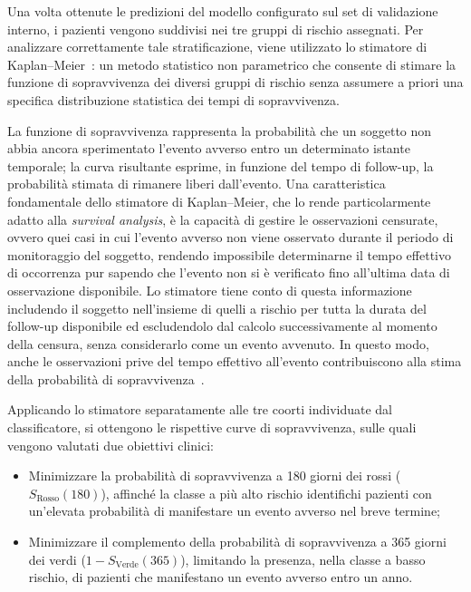 \documentclass[a4paper,12pt]{report}
\begin{document}
Una volta ottenute le predizioni del modello configurato sul set di validazione interno, i pazienti vengono suddivisi nei tre gruppi di rischio assegnati. Per analizzare correttamente tale stratificazione, viene utilizzato lo stimatore di Kaplan--Meier~\cite{Kaplan01061958}: un metodo statistico non parametrico che consente di stimare la funzione di sopravvivenza dei diversi gruppi di rischio senza assumere a priori una specifica distribuzione statistica dei tempi di sopravvivenza.

La funzione di sopravvivenza rappresenta la probabilità che un soggetto non abbia ancora sperimentato l'evento avverso entro un determinato istante temporale; la curva risultante esprime, in funzione del tempo di follow-up, la probabilità stimata di rimanere liberi dall'evento. Una caratteristica fondamentale dello stimatore di Kaplan--Meier, che lo rende particolarmente adatto alla \textit{survival analysis}, è la capacità di gestire le osservazioni censurate, ovvero quei casi in cui l'evento avverso non viene osservato durante il periodo di monitoraggio del soggetto, rendendo impossibile determinarne il tempo effettivo di occorrenza pur sapendo che l'evento non si è verificato fino all'ultima data di osservazione disponibile. Lo stimatore tiene conto di questa informazione includendo il soggetto nell'insieme di quelli a rischio per tutta la durata del follow-up disponibile ed escludendolo dal calcolo successivamente al momento della censura, senza considerarlo come un evento avvenuto. In questo modo, anche le osservazioni prive del tempo effettivo all'evento contribuiscono alla stima della probabilità di sopravvivenza~\cite{Kaplan01061958}.

Applicando lo stimatore separatamente alle tre coorti individuate dal classificatore, si ottengono le rispettive curve di sopravvivenza, sulle quali vengono valutati due obiettivi clinici:
\begin{itemize}
    \item Minimizzare la probabilità di sopravvivenza a 180 giorni dei rossi (\(S_{\text{Rosso}}(180)\)), affinché la classe a più alto rischio identifichi pazienti con un'elevata probabilità di manifestare un evento avverso nel breve termine;
    \item Minimizzare il complemento della probabilità di sopravvivenza a 365 giorni dei verdi (\(1-S_{\text{Verde}}(365)\)), limitando la presenza, nella classe a basso rischio, di pazienti che manifestano un evento avverso entro un anno.
\end{itemize}
\end{document}
